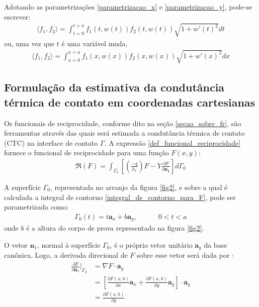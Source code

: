 Adotando as parametrizações \eqref{parametrizacao_x} e \eqref{parametrizacao_y}, pode-se escrever:
\begin{align} 
\langle f_1, f_2\rangle = \int_{t=0}^{t=a}f_1(t, w(t))f_2(t, w(t))\sqrt{1 + w'(t)^2}dt \label{integral_da_definicao_produto_interno_3}
\end{align}
ou, uma vez que $t$ é uma variável muda,
\begin{align}
\langle f_1, f_2\rangle = \int_{x=0}^{x=a}f_1(x, w(x))f_2(x, w(x))\sqrt{1 + w'(x)^2}dx \label{integral_da_definicao_produto_interno_4}
\end{align}

\subsection{Formulação da estimativa da condutância térmica de contato em coordenadas cartesianas}\label{secao_com_funcionais}

Os funcionais de reciprocidade, conforme dito na seção \ref{secao_sobre_fr}, são ferramentas através das quais será estimada a condutância térmica de contato (CTC) na interface de contato $\Gamma$. A expressão \eqref{def_funcional_reciprocidade} fornece o funcional de reciprocidade para uma função $F(x, y)$:
\begin{align}
\Re(F)
=
\int_{\Gamma_0}\left[\left(\frac{-q}{k_1}\right)F - Y\frac{\partial F}{\partial\mathbf{n_1}}\right]d\Gamma_0
\label{integral_de_contorno_para_F}
\end{align}

A superfície $\Gamma_0$, representada no arranjo da figura \ref{fig2}, e sobre a qual é calculada a integral de contorno \eqref{integral_de_contorno_para_F}, pode ser parametrizada como:
\begin{align}
\Gamma_0(t) = t\mathbf{a}_x + b \mathbf{a}_y, \quad\quad\quad 0 < t < a
\end{align}
onde $b$ é a altura do corpo de prova representado na figura \ref{fig2}.

O vetor $\mathbf{n}_1$, normal à superfície $\Gamma_0$, é o próprio vetor unitário $\mathbf{a}_y$ da base canônica. Logo, a derivada direcional de $F$ sobre esse vetor será dada por \citep{livro_stewart_2}:
\begin{align}
\frac{\partial F}{\partial\mathbf{n}_1}\bigg|_{\Gamma_0} & = \nabla F \cdot \mathbf{a}_y \nonumber \\
& = \left[\frac{\partial F(x, b)}{\partial x}\mathbf{a}_x + \frac{\partial F(x, b)}{\partial y}\mathbf{a}_y \right] \cdot \mathbf{a}_y \nonumber \\
& = \frac{\partial F(x, b)}{\partial y}
\end{align} 

